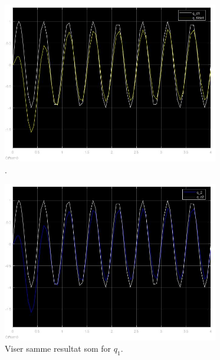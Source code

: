 \documentclass[norsk]{article}
\begin{document}
\subsection{ }
\begin{figure}[H]
\includegraphics[height=7cm]{illustrations/oppg3h_illu1}
\caption{.}
\end{figure}

\begin{figure}[H]
\includegraphics[height=7cm]{illustrations/oppg3h_illu2}
\caption{Viser samme resultat som for \(q_1\).}
\end{figure}
\end{document}
